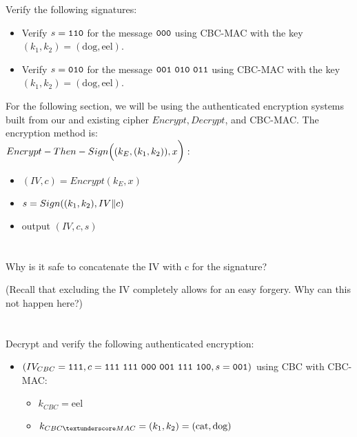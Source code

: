 \documentclass[12pt]{article}
\let\sol=\undefined
\newcommand{\sol}[1]{}
\begin{document}
Verify the following signatures:

\begin{itemize}
\item Verify $s = {\tt 110}$ for the message ${\tt 000}$ using CBC-MAC with the key $(k_1, k_2) = (\text{dog}, \text{eel})$.
\item Verify $s = {\tt 010}$ for the message ${\tt 001~010~011}$ using CBC-MAC with the key $(k_1, k_2) = (\text{dog}, \text{eel})$.
\end{itemize}

\newpage
For the following section, we will be using the authenticated encryption systems built from our and existing cipher $Encrypt, Decrypt$, and CBC-MAC. The encryption method is:\\

$Encrypt-Then-Sign\Big(\large(k_E, (k_1, k_2)\large), x\Big):$

\begin{itemize}
\item $(IV, c) = Encrypt(k_E, x)$
\item $s = Sign\Large((k_1, k_2), IV \| c\Large)$
\item output $(IV, c, s)$
\end{itemize}

\section{}

Why is it safe to concatenate the IV with c for the signature?

(Recall that excluding the IV completely allows for an easy forgery. Why can this not happen here?)

\section{}

Decrypt and verify the following authenticated encryption:

\begin{itemize}
\item $(IV_{CBC} = {\tt 111}, c = {\tt 111~111~000~001~111~100}, s = {\tt 001})$ using CBC with CBC-MAC:
\begin{itemize}
\item $k_{CBC} = \text{eel}$
\item $k_{CBC{\textunderscore}MAC} = (k_1, k_2) = (\text{cat}, \text{dog})$ \\\sol{{\tt 011}}
\end{itemize}
\end{itemize}
\end{document}
